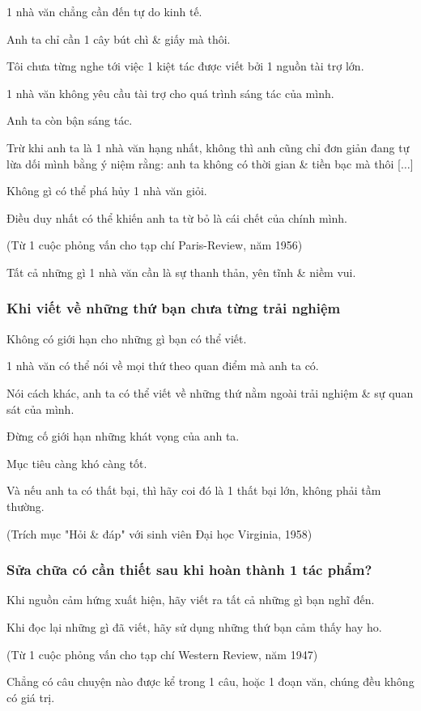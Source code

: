 \documentclass{article}
\begin{document}
1 nhà văn chẳng cần đến tự do kinh tế.

Anh ta chỉ cần 1 cây bút chì \& giấy mà thôi.

Tôi chưa từng nghe tới việc 1 kiệt tác được viết bởi 1 nguồn tài trợ lớn.

1 nhà văn không yêu cầu tài trợ cho quá trình sáng tác của mình.

Anh ta còn bận sáng tác.

Trừ khi anh ta là 1 nhà văn hạng nhất, không thì anh cũng chỉ đơn giản đang tự lừa dối mình bằng ý niệm rằng: anh ta không có thời gian \& tiền bạc mà thôi [$\ldots$]

Không gì có thể phá hủy 1 nhà văn giỏi.

Điều duy nhất có thể khiến anh ta từ bỏ là cái chết của chính mình.

(Từ 1 cuộc phỏng vấn cho tạp chí Paris-Review, năm 1956)

\textsf{Tất cả những gì 1 nhà văn cần là sự thanh thản, yên tĩnh \& niềm vui.}

\subsubsection{Khi viết về những thứ bạn chưa từng trải nghiệm}
Không có giới hạn cho những gì bạn có thể viết.

1 nhà văn có thể nói về mọi thứ theo quan điểm mà anh ta có.

Nói cách khác, anh ta có thể viết về những thứ nằm ngoài trải nghiệm \& sự quan sát của mình.

Đừng cố giới hạn những khát vọng của anh ta.

Mục tiêu càng khó càng tốt.

Và nếu anh ta có thất bại, thì hãy coi đó là 1 thất bại lớn, không phải tầm thường.

(Trích mục "Hỏi \& đáp" với sinh viên Đại học Virginia, 1958)

\subsubsection{Sửa chữa có cần thiết sau khi hoàn thành 1 tác phẩm?}
Khi nguồn cảm hứng xuất hiện, hãy viết ra tất cả những gì bạn nghĩ đến.

Khi đọc lại những gì đã viết, hãy sử dụng những thứ bạn cảm thấy hay ho.

(Từ 1 cuộc phỏng vấn cho tạp chí Western Review, năm 1947)

%
Chẳng có câu chuyện nào được kể trong 1 câu, hoặc 1 đoạn văn, chúng đều không có giá trị.
\end{document}
